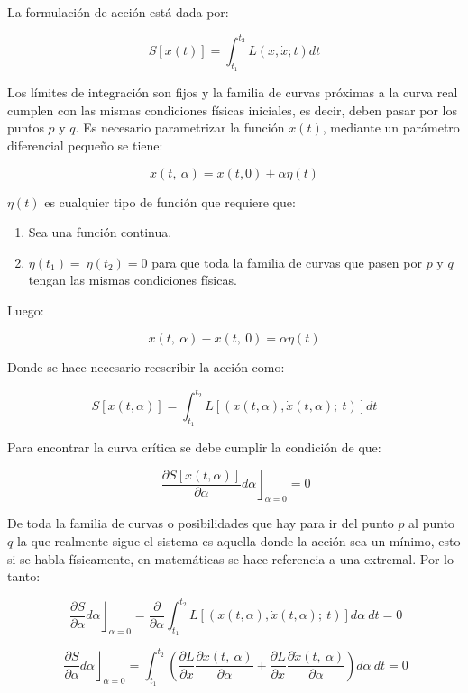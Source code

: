 \documentclass[]{article}
\begin{document}
La formulación de acción está dada por:

\[S\left\lbrack x(t) \right\rbrack = \int_{t_{1}}^{t_{2}}{L\left( x,\dot{x};t \right)dt}\]

Los límites de integración son fijos y la familia de curvas próximas a
la curva real cumplen con las mismas condiciones físicas iniciales, es
decir, deben pasar por los puntos \(p\) y \(q\). Es necesario
parametrizar la función \(x(t)\), mediante un parámetro diferencial
pequeño se tiene:

\[x(t,\ \alpha) = x(t,0) + \alpha\eta(t)\]

\(\eta(t)\) es cualquier tipo de función que requiere que:

\begin{enumerate}
\def\labelenumi{\arabic{enumi})}
\item
  Sea una función continua.
\item
  \(\eta(t_{1}) = \ \eta\left( t_{2} \right) = 0\) para que toda la
  familia de curvas que pasen por \(p\) y \(q\) tengan las mismas
  condiciones físicas.
\end{enumerate}

Luego:

\[x(t,\ \alpha) - x(t,\ 0) = \alpha\eta(t)\]

Donde se hace necesario reescribir la acción como:

\[S\left\lbrack x(t,\alpha) \right\rbrack = \int_{t_{1}}^{t_{2}}{L\left\lbrack \left( x(t,\alpha),\dot{x}(t,\alpha);\ t \right) \right\rbrack dt}\]

Para encontrar la curva crítica se debe cumplir la condición de que:

\[\left. \ \frac{\partial S\left\lbrack x(t,\alpha) \right\rbrack}{\partial\alpha}d\alpha \right\rfloor_{\alpha = 0} = 0\]

De toda la familia de curvas o posibilidades que hay para ir del punto
\(p\) al punto \(q\) la que realmente sigue el sistema es aquella donde
la acción sea un mínimo, esto si se habla físicamente, en matemáticas se
hace referencia a una extremal. Por lo tanto:

\[\left. \ \frac{\partial S}{\partial\alpha}d\alpha \right\rfloor_{\alpha = 0} = \frac{\partial}{\partial\alpha}\int_{t_{1}}^{t_{2}}{L\left\lbrack \left( x(t,\alpha),\dot{x}(t,\alpha);\ t \right) \right\rbrack d\alpha\ dt} = 0\]

\[\left. \ \frac{\partial S}{\partial\alpha}d\alpha \right\rfloor_{\alpha = 0} = \int_{t_{1}}^{t_{2}}\left( \frac{\partial L}{\partial x}\frac{\partial x(t,\ \alpha)}{\partial\alpha} + \frac{\partial L}{\partial\dot{x}}\frac{\partial\dot{x}(t,\ \alpha)}{\partial\alpha} \right)d\alpha\ dt = 0\]
\end{document}
